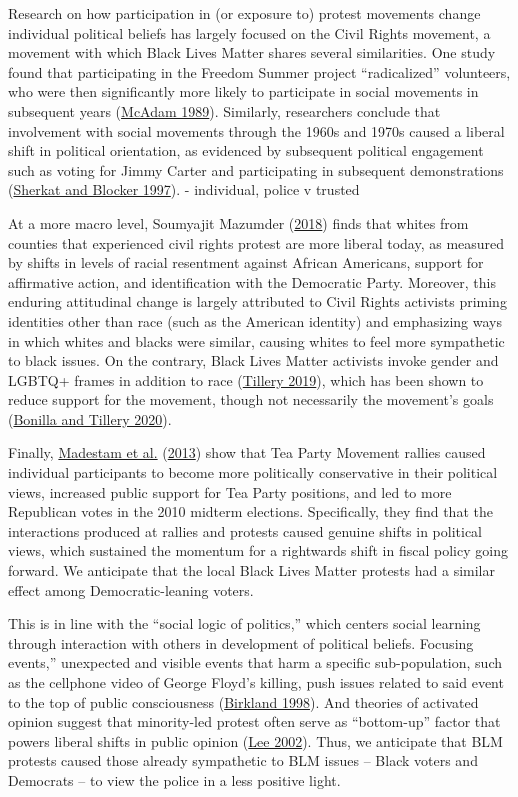 \documentclass[
  12pt,
]{article}
\begin{document}
Research on how participation in (or exposure to) protest movements change individual political beliefs has largely focused on the Civil Rights movement, a movement with which Black Lives Matter shares several similarities. One study found that participating in the Freedom Summer project ``radicalized'' volunteers, who were then significantly more likely to participate in social movements in subsequent years (\protect\hyperlink{ref-McAdam1989}{McAdam 1989}). Similarly, researchers conclude that involvement with social movements through the 1960s and 1970s caused a liberal shift in political orientation, as evidenced by subsequent political engagement such as voting for Jimmy Carter and participating in subsequent demonstrations (\protect\hyperlink{ref-Sherkat1997}{Sherkat and Blocker 1997}). - individual, police v trusted

At a more macro level, Soumyajit Mazumder (\protect\hyperlink{ref-Mazumder2018}{2018}) finds that whites from counties that experienced civil rights protest are more liberal today, as measured by shifts in levels of racial resentment against African Americans, support for affirmative action, and identification with the Democratic Party. Moreover, this enduring attitudinal change is largely attributed to Civil Rights activists priming identities other than race (such as the American identity) and emphasizing ways in which whites and blacks were similar, causing whites to feel more sympathetic to black issues. On the contrary, Black Lives Matter activists invoke gender and LGBTQ+ frames in addition to race (\protect\hyperlink{ref-Tillery2019}{Tillery 2019}), which has been shown to reduce support for the movement, though not necessarily the movement's goals (\protect\hyperlink{ref-Bonilla2020}{Bonilla and Tillery 2020}).

Finally, \protect\hyperlink{ref-Madestam2013}{Madestam et al.} (\protect\hyperlink{ref-Madestam2013}{2013}) show that Tea Party Movement rallies caused individual participants to become more politically conservative in their political views, increased public support for Tea Party positions, and led to more Republican votes in the 2010 midterm elections. Specifically, they find that the interactions produced at rallies and protests caused genuine shifts in political views, which sustained the momentum for a rightwards shift in fiscal policy going forward. We anticipate that the local Black Lives Matter protests had a similar effect among Democratic-leaning voters.

This is in line with the ``social logic of politics,'' which centers social learning through interaction with others in development of political beliefs. Focusing events,'' unexpected and visible events that harm a specific sub-population, such as the cellphone video of George Floyd's killing, push issues related to said event to the top of public consciousness (\protect\hyperlink{ref-Birkland1998}{Birkland 1998}). And theories of activated opinion suggest that minority-led protest often serve as ``bottom-up'' factor that powers liberal shifts in public opinion (\protect\hyperlink{ref-Lee2002}{Lee 2002}). Thus, we anticipate that BLM protests caused those already sympathetic to BLM issues -- Black voters and Democrats -- to view the police in a less positive light.
\end{document}
